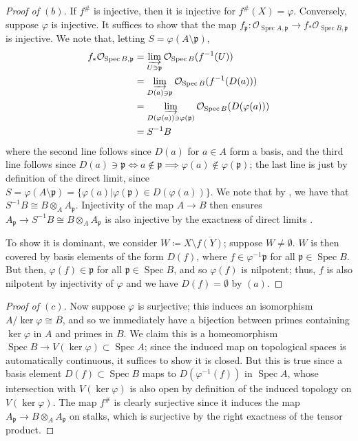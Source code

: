 \documentclass[10pt]{article}
\theoremstyle{definition}
\theoremstyle{remark}
\numberwithin{equation}{section}
\numberwithin{figure}{subsubsection}
\DeclareMathOperator{\Spec}{Spec}
\newcommand{\OO}{\mathcal{O}}
\begin{document}
\begin{proof}[Proof of $(b)$]
  If $f^\#$ is injective, then it is injective for $f^\#(X) = \varphi$. Conversely, suppose $\varphi$ is injective. It suffices to show that the map $f_\mathfrak{p}\colon \OO_{\Spec A,\mathfrak{p}} \to f_*\OO_{\Spec B,\mathfrak{p}}$ is injective. We note that, letting $S = \varphi(A \setminus \mathfrak{p})$,
  \begin{align*}
    f_*\OO_{\Spec B,\mathfrak{p}} &= \varinjlim_{U \ni \mathfrak{p}} \OO_{\Spec B}(f^{-1}(U))\\
    &= \varinjlim_{D(a) \ni \mathfrak{p}} \OO_{\Spec B}(f^{-1}(D(a)))\\
    &= \varinjlim_{D(\varphi(a)) \ni \varphi(\mathfrak{p})} \OO_{\Spec B}(D(\varphi(a)))\\
    &= S^{-1}B
  \end{align*}
  where the second line follows since $D(a)$ for $a \in A$ form a basis, and the third line follows since $D(a) \ni \mathfrak{p} \iff a \notin \mathfrak{p} \implies \varphi(a) \notin \varphi(\mathfrak{p})$; the last line is just by definition of the direct limit, since $S = \varphi(A \setminus \mathfrak{p}) = \{\varphi(a) \vert \varphi(\mathfrak{p}) \in D(\varphi(a)) \}$. We note that by \cite[Prop.~3.5]{AM69}, we have that $S^{-1}B \cong B \otimes_A A_\mathfrak{p}$. Injectivity of the map $A \to B$ then ensures $A_\mathfrak{p} \to S^{-1}B \cong B \otimes_A A_\mathfrak{p}$ is also injective by the exactness of direct limits \cite[Ex.~2.19]{AM69}.
  \par To show it is dominant, we consider $W \coloneqq X \setminus \overline{f(Y)}$; suppose $W \ne \emptyset$. $W$ is then covered by basis elements of the form $D(f)$, where $f \in \varphi^{-1}\mathfrak{p}$ for all $\mathfrak{p} \in \Spec B$. But then, $\varphi(f) \in \mathfrak{p}$ for all $\mathfrak{p} \in \Spec B$, and so $\varphi(f)$ is nilpotent; thus, $f$ is also nilpotent by injectivity of $\varphi$ and we have $D(f) = \emptyset$ by $(a)$.
\end{proof}
\begin{proof}[Proof of $(c)$]
  Now suppose $\varphi$ is surjective; this induces an isomorphism $A/\ker\varphi \cong B$, and so we immediately have a bijection between primes containing $\ker\varphi$ in $A$ and primes in $B$. We claim this is a homeomorphism $\Spec B \to V(\ker\varphi) \subset \Spec A$; since the induced map on topological spaces is automatically continuous, it suffices to show it is closed. But this is true since a basis element $D(f) \subset \Spec B$ maps to $D(\varphi^{-1}(f))$ in $\Spec A$, whose intersection with $V(\ker\varphi)$ is also open by definition of the induced topology on $V(\ker\varphi)$. The map $f^\#$ is clearly surjective since it induces the map $A_\mathfrak{p} \to B \otimes_A A_\mathfrak{p}$ on stalks, which is surjective by the right exactness of the tensor product.
\end{proof}
\end{document}

